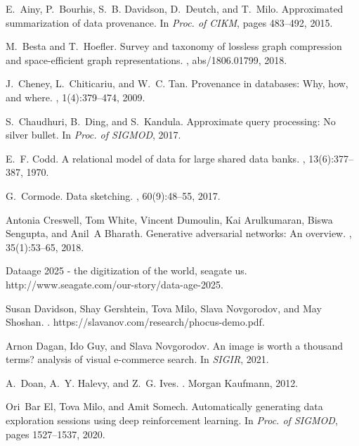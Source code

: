 \documentclass[11pt,dvipdfm]{article}
\begin{document}
\begin{thebibliography}{10}
\itemsep=1pt
\begin{small}

E.~Ainy, P.~Bourhis, S.~B. Davidson, D.~Deutch, and T.~Milo.
\newblock Approximated summarization of data provenance.
\newblock In {\em Proc. of CIKM}, pages 483--492, 2015.

M.~Besta and T.~Hoefler.
\newblock Survey and taxonomy of lossless graph compression and space-efficient
  graph representations.
, abs/1806.01799, 2018.

J.~Cheney, L.~Chiticariu, and W.~C. Tan.
\newblock Provenance in databases: Why, how, and where.
, 1(4):379--474, 2009.

S.~Chaudhuri, B.~Ding, and S.~Kandula.
\newblock Approximate query processing: No silver bullet.
\newblock In {\em Proc. of SIGMOD}, 2017.

E.~F. Codd.
\newblock A relational model of data for large shared data banks.
, 13(6):377--387, 1970.

G.~Cormode.
\newblock Data sketching.
, 60(9):48--55, 2017.

Antonia Creswell, Tom White, Vincent Dumoulin, Kai Arulkumaran, Biswa Sengupta,
  and Anil~A Bharath.
\newblock Generative adversarial networks: An overview.
, 35(1):53--65, 2018.

Dataage 2025 - the digitization of the world, seagate us.
\newblock http://www.seagate.com/our-story/data-age-2025.

Susan Davidson, Shay Gershtein, Tova Milo, Slava Novgorodov, and May Shoshan.
.
\newblock https://slavanov.com/research/phocus-demo.pdf.

Arnon Dagan, Ido Guy, and Slava Novgorodov.
\newblock An image is worth a thousand terms? analysis of visual e-commerce
  search.
\newblock In {\em SIGIR}, 2021.

A.~Doan, A.~Y. Halevy, and Z.~G. Ives.
.
\newblock Morgan Kaufmann, 2012.

Ori~Bar El, Tova Milo, and Amit Somech.
\newblock Automatically generating data exploration sessions using deep
  reinforcement learning.
\newblock In {\em Proc. of SIGMOD}, pages 1527--1537, 2020.


\end{small}
\end{thebibliography}
\end{document}
